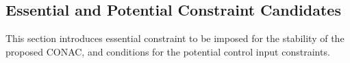 \documentclass[lettersize,journal]{IEEEtran}
\begin{document}


\subsection{Essential and Potential Constraint Candidates}\label{sec:sub:cstr} 

This section introduces essential constraint to be imposed for the stability of the proposed CONAC, and conditions for the potential control input constraints.
\end{document}

